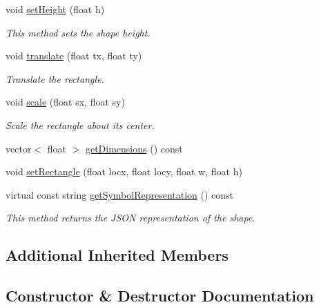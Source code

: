 \begin{DoxyCompactItemize}
void \hyperlink{classbridges_1_1datastructure_1_1_rectangle_a6a3e99759282dd822c5615d1643f2a81}{set\+Height} (float h)
\begin{DoxyCompactList}\small\item\em This method sets the shape height. \end{DoxyCompactList}\item 
void \hyperlink{classbridges_1_1datastructure_1_1_rectangle_a910c2a92c38e2e13bde3f1fd51b17316}{translate} (float tx, float ty)
\begin{DoxyCompactList}\small\item\em Translate the rectangle. \end{DoxyCompactList}\item 
void \hyperlink{classbridges_1_1datastructure_1_1_rectangle_ae17021407556e0d434b54a81d94614b3}{scale} (float sx, float sy)
\begin{DoxyCompactList}\small\item\em Scale the rectangle about its center. \end{DoxyCompactList}\item 
vector$<$ float $>$ \hyperlink{classbridges_1_1datastructure_1_1_rectangle_a60e75bd0d064c63a726134cd5ca0b827}{get\+Dimensions} () const
\item 
void \hyperlink{classbridges_1_1datastructure_1_1_rectangle_a01e49a75f3826ea63e581d3669e3626b}{set\+Rectangle} (float locx, float locy, float w, float h)
\item 
virtual const string \hyperlink{classbridges_1_1datastructure_1_1_rectangle_ada89ed40d2515a3518084f5460ba8dac}{get\+Symbol\+Representation} () const
\begin{DoxyCompactList}\small\item\em This method returns the J\+S\+ON representation of the shape. \end{DoxyCompactList}\end{DoxyCompactItemize}
\subsection*{Additional Inherited Members}


\subsection{Constructor \& Destructor Documentation}
\mbox{\label{classbridges_1_1datastructure_1_1_rectangle_a83c7e793c1335073c2a7093bbcf0c5bb}} 
